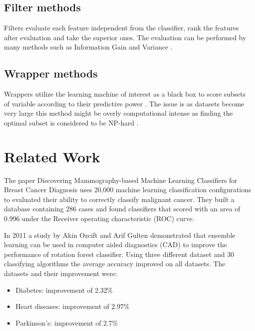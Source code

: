 \documentclass{kththesis}
\begin{document}
\subsection{Filter methods}

Filters evaluate each feature independent from the classifier, rank the features after evaluation and take the superior ones. The evaluation can be performed by many methods such as Information Gain and Variance \parencite{guyon2003}.

\subsection{Wrapper methods}

Wrappers utilize the learning machine of interest as a black box to score subsets of variable according to their predictive power \parencite{guyon2003}. The issue is as datasets become very large this method might be overly computational intense as finding the optimal subset is considered to be NP-hard \parencite{amaldi1998}.

\section{Related Work}

The paper Discovering Mammography-based Machine Learning Classifiers for Breast Cancer Diagnosis \parencite{ramos2012} uses 20,000 machine learning classification configurations to evaluated their ability to correctly classify malignant cancer. They built a database containing 286 cases and found classifiers that scored with an area of 0.996 under the Receiver operating characteristic (ROC) curve.



In 2011 a study by Akin Ozcift and Arif Gulten \parencite{akin2011} demonstrated that ensemble learning can be used in computer aided diagnostics (CAD) to improve the performance of rotation forest classifier. Using three different dataset and 30 classifying algorithms the average accuracy improved on all datasets. The datasets and their improvement were:

\begin{itemize}
  \item Diabetes: improvement of 2.32\%
  \item Heart diseases: improvement of 2.97\%
  \item Parkinson's: improvement of 2.7\%
\end{itemize}
\end{document}
